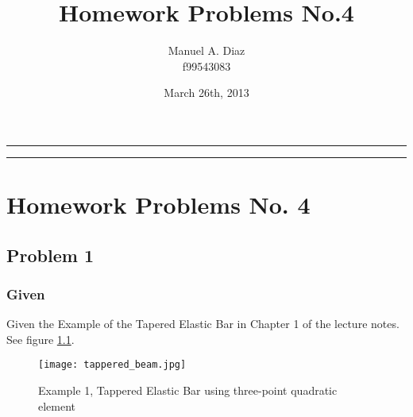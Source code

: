 \documentclass[a4paper]{memoir}
\title{\huge \textbf{Homework Problems No.4}}
\author{Manuel A. Diaz \\ f99543083}
\date{March 26th, 2013} %
\begin{document}
\thispagestyle{empty}
\begin{center}{
\begin{shaded}
\hrule \vspace{30pt}
\hspace{30pt} \thetitle  \vspace{30pt}
\newline \theauthor \hspace{30pt} \thedate  \vspace{26pt}
\hrule
\end{shaded}
}
\end{center}
\clearpage


\pagestyle{Ruled}                    %
\midsloppy                             %


\checkandfixthelayout          %

\chapter{Homework Problems No. 4}
\section{Problem 1}
\subsection{Given}
Given the Example of the Tapered Elastic Bar in Chapter 1 of the lecture notes. See figure \ref{fig:tappered_beam}.

\begin{figure}
	\centering
		\texttt{[image: tappered\_beam.jpg]}
	\caption{Example 1, Tappered Elastic Bar using three-point quadratic element}
	\label{fig:tappered_beam}
\end{figure}
\end{document}
